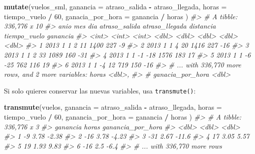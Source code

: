 \documentclass[11pt,oneside]{report}
\newenvironment{Shaded}{\begin{snugshade}}{\end{snugshade}}
\newcommand{\CommentTok}[1]{\textcolor[rgb]{0.56,0.35,0.01}{\textit{#1}}}
\newcommand{\DataTypeTok}[1]{\textcolor[rgb]{0.13,0.29,0.53}{#1}}
\newcommand{\DecValTok}[1]{\textcolor[rgb]{0.00,0.00,0.81}{#1}}
\newcommand{\KeywordTok}[1]{\textcolor[rgb]{0.13,0.29,0.53}{\textbf{#1}}}
\newcommand{\NormalTok}[1]{#1}
\newcommand{\OperatorTok}[1]{\textcolor[rgb]{0.81,0.36,0.00}{\textbf{#1}}}
\newcommand{\StringTok}[1]{\textcolor[rgb]{0.31,0.60,0.02}{#1}}
\begin{document}
\begin{Shaded}
\begin{Highlighting}[]
\KeywordTok{mutate}\NormalTok{(vuelos_sml,}
  \DataTypeTok{ganancia =}\NormalTok{ atraso_salida }\OperatorTok{-}\StringTok{ }\NormalTok{atraso_llegada,}
  \DataTypeTok{horas =}\NormalTok{ tiempo_vuelo }\OperatorTok{/}\StringTok{ }\DecValTok{60}\NormalTok{,}
  \DataTypeTok{ganacia_por_hora =}\NormalTok{ ganancia }\OperatorTok{/}\StringTok{ }\NormalTok{horas}
\NormalTok{)}
\CommentTok{#> # A tibble: 336,776 x 10}
\CommentTok{#>    anio   mes   dia atraso_salida atraso_llegada distancia tiempo_vuelo ganancia}
\CommentTok{#>   <int> <int> <int>         <dbl>          <dbl>     <dbl>        <dbl>    <dbl>}
\CommentTok{#> 1  2013     1     1             2             11      1400          227       -9}
\CommentTok{#> 2  2013     1     1             4             20      1416          227      -16}
\CommentTok{#> 3  2013     1     1             2             33      1089          160      -31}
\CommentTok{#> 4  2013     1     1            -1            -18      1576          183       17}
\CommentTok{#> 5  2013     1     1            -6            -25       762          116       19}
\CommentTok{#> 6  2013     1     1            -4             12       719          150      -16}
\CommentTok{#> # ... with 336,770 more rows, and 2 more variables: horas <dbl>,}
\CommentTok{#> #   ganacia_por_hora <dbl>}
\end{Highlighting}
\end{Shaded}

Si solo quieres conservar las nuevas variables, usa
\texttt{transmute()}:

\begin{Shaded}
\begin{Highlighting}[]
\KeywordTok{transmute}\NormalTok{(vuelos,}
  \DataTypeTok{ganancia =}\NormalTok{ atraso_salida }\OperatorTok{-}\StringTok{ }\NormalTok{atraso_llegada,}
  \DataTypeTok{horas =}\NormalTok{ tiempo_vuelo }\OperatorTok{/}\StringTok{ }\DecValTok{60}\NormalTok{,}
  \DataTypeTok{ganancia_por_hora =}\NormalTok{ ganancia }\OperatorTok{/}\StringTok{ }\NormalTok{horas}
\NormalTok{)}
\CommentTok{#> # A tibble: 336,776 x 3}
\CommentTok{#>   ganancia horas ganancia_por_hora}
\CommentTok{#>      <dbl> <dbl>             <dbl>}
\CommentTok{#> 1       -9  3.78             -2.38}
\CommentTok{#> 2      -16  3.78             -4.23}
\CommentTok{#> 3      -31  2.67            -11.6 }
\CommentTok{#> 4       17  3.05              5.57}
\CommentTok{#> 5       19  1.93              9.83}
\CommentTok{#> 6      -16  2.5              -6.4 }
\CommentTok{#> # ... with 336,770 more rows}
\end{Highlighting}
\end{Shaded}
\end{document}
